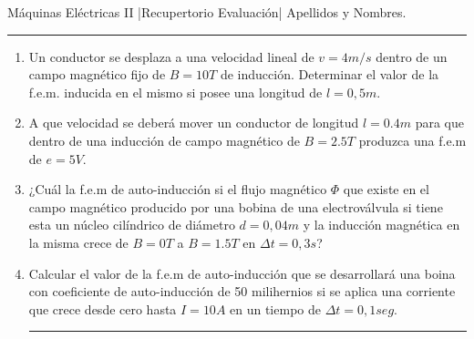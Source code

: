 \documentclass[./eval.tex]{subfiles}
\newcommand{\head}{\noindent Máquinas Eléctricas II |Recupertorio Evaluación| Apellidos y Nombres.
\rule{10cm}{0.1mm}}
\newcommand{\separador}{\noindent\rule{\paperwidth}{0.1mm}\newline}
\begin{document}
\head

 \begin{enumerate}
 \item Un conductor se desplaza a una velocidad lineal de $v=4m/s$ dentro de un campo magnético fijo de $B=10T$ de inducción. Determinar el valor de la f.e.m. inducida en el mismo si posee una longitud de $l=0,5m$.
    \item A que velocidad se deberá mover un conductor de longitud $l=0.4m$ para que dentro de una inducción de campo magnético de $B=2.5T$ produzca una f.e.m de $e=5V$.
    \item ¿Cuál la f.e.m de auto-inducción si el flujo magnético $\Phi$ que existe en el campo magnético producido por una bobina de una electroválvula si tiene esta un núcleo cilíndrico de diámetro $d=0,04m$ y la inducción magnética en la misma crece de $B=0T$ a $B=1.5T$ en $\Delta t=0,3s$?
    \item Calcular el valor de la f.e.m de auto-inducción que se desarrollará una boina con coeficiente de auto-inducción de 50 milihernios si se aplica una corriente que crece desde cero hasta $I=10A$ en un tiempo de $\Delta t=0,1 seg.$
    \separador
\end{enumerate}
\end{document}
